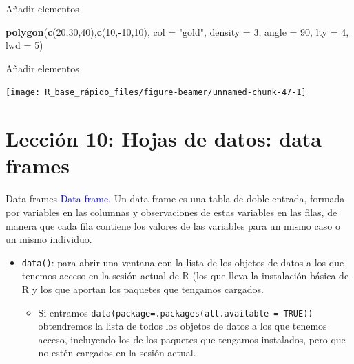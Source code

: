 \documentclass[
  ignorenonframetext,
  aspectratio=169]{beamer}
\newenvironment{Shaded}{\begin{snugshade}}{\end{snugshade}}
\newcommand{\AttributeTok}[1]{\textcolor[rgb]{0.13,0.29,0.53}{#1}}
\newcommand{\DecValTok}[1]{\textcolor[rgb]{0.00,0.00,0.81}{#1}}
\newcommand{\FunctionTok}[1]{\textcolor[rgb]{0.13,0.29,0.53}{\textbf{#1}}}
\newcommand{\NormalTok}[1]{#1}
\newcommand{\SpecialCharTok}[1]{\textcolor[rgb]{0.81,0.36,0.00}{\textbf{#1}}}
\newcommand{\StringTok}[1]{\textcolor[rgb]{0.31,0.60,0.02}{#1}}
\providecommand{\tightlist}{%
  \setlength{\itemsep}{0pt}\setlength{\parskip}{0pt}}
\newcommand\blue[1]{\textcolor{blue}{#1}}
\begin{document}
\begin{frame}[fragile]{Añadir elementos}
\begin{Shaded}
\begin{Highlighting}[]
\FunctionTok{polygon}\NormalTok{(}\FunctionTok{c}\NormalTok{(}\DecValTok{20}\NormalTok{,}\DecValTok{30}\NormalTok{,}\DecValTok{40}\NormalTok{),}\FunctionTok{c}\NormalTok{(}\DecValTok{10}\NormalTok{,}\SpecialCharTok{{-}}\DecValTok{10}\NormalTok{,}\DecValTok{10}\NormalTok{), }\AttributeTok{col =} \StringTok{"gold"}\NormalTok{,}
        \AttributeTok{density =} \DecValTok{3}\NormalTok{, }\AttributeTok{angle =} \DecValTok{90}\NormalTok{, }\AttributeTok{lty =} \DecValTok{4}\NormalTok{, }
        \AttributeTok{lwd =} \DecValTok{5}\NormalTok{)}
\end{Highlighting}
\end{Shaded}
\end{frame}

\begin{frame}{Añadir elementos}
\label{auxf1adir-elementos-1}
\begin{center}\texttt{[image: R\_base\_rápido\_files/figure-beamer/unnamed-chunk-47-1]} \end{center}
\end{frame}

\section{Lección 10: Hojas de datos: data
frames}\label{lecciuxf3n-10-hojas-de-datos-data-frames}

\begin{frame}[fragile]{Data frames}
\label{data-frames}
\blue{Data frame.} Un data frame es una tabla de doble entrada, formada
por variables en las columnas y observaciones de estas variables en las
filas, de manera que cada fila contiene los valores de las variables
para un mismo caso o un mismo individuo.

\begin{itemize}
\item
  \texttt{data()}: para abrir una ventana con la lista de los objetos de
  datos a los que tenemos acceso en la sesión actual de R (los que lleva
  la instalación básica de R y los que aportan los paquetes que tengamos
  cargados.

  \begin{itemize}
  \tightlist
  \item
    Si entramos \texttt{data(package=.packages(all.available\ =\ TRUE))}
    obtendremos la lista de todos los objetos de datos a los que tenemos
    acceso, incluyendo los de los paquetes que tengamos instalados, pero
    que no estén cargados en la sesión actual.
  \end{itemize}
\end{itemize}
\end{frame}
\end{document}
